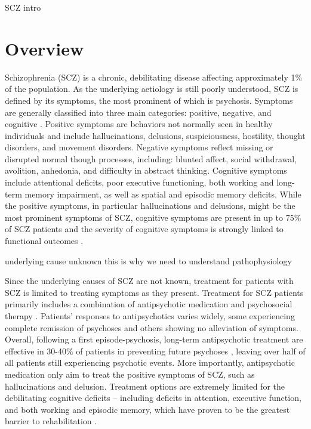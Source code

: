 SCZ intro

\section{Overview}
Schizophrenia (SCZ) is a chronic, debilitating disease affecting approximately 1$\%$ of the population\citep{NIMHb}.
As the underlying aetiology is still poorly understood, SCZ is defined by its symptoms, the most prominent of which is psychosis.
Symptoms are generally classified into three main categories: positive, negative, and cognitive \citep{Kay1982}\citep{NIMHa}.
Positive symptoms are behaviors not normally seen in healthy individuals and include hallucinations, delusions, suspiciousness, hostility, thought disorders, and movement disorders.
Negative symptoms reflect missing or disrupted normal though processes, including: blunted affect, social withdrawal, avolition, anhedonia, and difficulty in abstract thinking.
Cognitive symptoms include attentional deficits, poor executive functioning, both working and long-term memory impairment, as well as spatial and episodic memory deficits.
While the positive symptoms, in particular hallucinations and delusions, might be the most prominent symptoms of SCZ, cognitive symptoms are present in up to 75$\%$ of SCZ patients and the severity of cognitive symptoms is strongly linked to functional outcomes \citep{O'Carroll2000}\citep{Green1996}\citep{Keefe2007}.



underlying cause unknown
this is why we need to understand pathophysiology

Since the underlying causes of SCZ are not known, treatment for patients with SCZ is limited to treating symptoms as they present.
Treatment for SCZ patients primarily includes a combination of antipsychotic medication and psychosocial therapy \citep{NIMHa}.
Patients’ responses to antipsychotics varies widely, some experiencing complete remission of psychoses and others showing no alleviation of symptoms.
Overall, following a first episode-psychosis, long-term antipsychotic treatment are effective in 30-40$\%$ of patients in preventing future psychoses \citep{Boyer2007}\citep{Insel2010}, leaving over half of all patients still experiencing psychotic events.
More importantly, antipsychotic medication only aim to treat the positive symptoms of SCZ, such as hallucinations and delusion.
Treatment options are extremely limited for the debilitating cognitive deficits – including deficits in attention, executive function, and both working and episodic memory, which have proven to be the greatest barrier to rehabilitation \citep{Lieberman2005}\citep{Harrison2001}\citep{O'Carroll2000}\citep{Hyman2003}.


